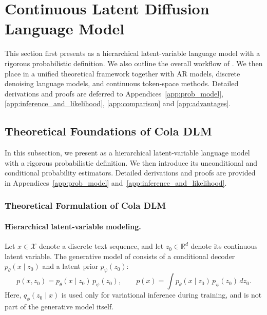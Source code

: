 
\section{Continuous Latent Diffusion Language Model}

This section first presents \method as a hierarchical latent-variable language model with a rigorous probabilistic definition. We also outline the overall workflow of \method. We then place \method in a unified theoretical framework together with AR models, discrete denoising language models, and continuous token-space methods. Detailed derivations and proofs are deferred to Appendices~\ref{app:prob_model}, \ref{app:inference_and_likelihood}, \ref{app:comparison} and \ref{app:advantages}.

\subsection{Theoretical Foundations of Cola DLM}

In this subsection, we present \method as a hierarchical latent-variable language model with a rigorous probabilistic definition. We then introduce its unconditional and conditional probability estimators. Detailed derivations and proofs are provided in Appendices~\ref{app:prob_model} and~\ref{app:inference_and_likelihood}.

\subsubsection{Theoretical Formulation of Cola DLM}

\paragraph{\textbf{Hierarchical latent-variable modeling.}}
Let \(x \in \mathcal X\) denote a discrete text sequence, and let \(z_0 \in \mathbb R^d\) denote its continuous latent variable. The generative model of \method consists of a conditional decoder \(p_\theta(x \mid z_0)\) and a latent prior \(p_\psi(z_0)\):
\begin{equation}
p(x,z_0)=p_\theta(x\mid z_0)\,p_\psi(z_0),
\qquad
p(x)=\int p_\theta(x\mid z_0)\,p_\psi(z_0)\,dz_0.
\label{eq:main_ldlm_joint}
\end{equation}
Here, \(q_\phi(z_0\mid x)\) is used only for variational inference during training, and is not part of the generative model itself.

